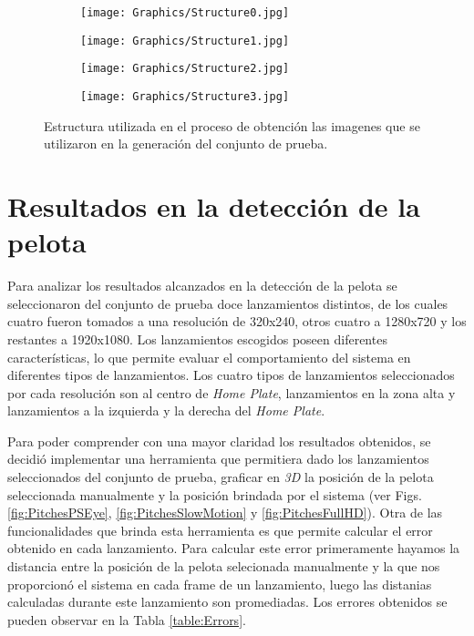 \begin{figure}[!h]
    \centering
    \begin{subfigure}[b]{0.49\linewidth}
        \texttt{[image: Graphics/Structure0.jpg]}
    \end{subfigure}
    \begin{subfigure}[b]{0.49\linewidth}
        \texttt{[image: Graphics/Structure1.jpg]}
    \end{subfigure}
    \begin{subfigure}[b]{0.49\linewidth}
        \texttt{[image: Graphics/Structure2.jpg]}
    \end{subfigure}
    \begin{subfigure}[b]{0.49\linewidth}
        \texttt{[image: Graphics/Structure3.jpg]}
    \end{subfigure}
	\caption{Estructura utilizada en el proceso de obtención las imagenes que se utilizaron en la generación del conjunto de prueba.}
	\label{fig:Structure}
\end{figure}

\section{Resultados en la detección de la pelota}

Para analizar los resultados alcanzados en la detección de la pelota se seleccionaron del conjunto de prueba doce lanzamientos distintos, de los cuales cuatro fueron tomados a una resolución de 320x240, otros cuatro a 1280x720 y los restantes a 1920x1080. Los lanzamientos escogidos poseen diferentes características, lo que permite evaluar el comportamiento del sistema en diferentes tipos de lanzamientos. Los cuatro tipos de lanzamientos seleccionados por cada resolución son al centro de \textit{Home Plate}, lanzamientos en la zona alta y lanzamientos a la izquierda y la derecha del \textit{Home Plate}.

Para poder comprender con una mayor claridad los resultados obtenidos, se decidió implementar una herramienta que permitiera dado los lanzamientos seleccionados del conjunto de prueba, graficar en \textit{3D} la posición de la pelota seleccionada manualmente y la posición brindada por el sistema (ver Figs. \ref{fig:PitchesPSEye}, \ref{fig:PitchesSlowMotion} y \ref{fig:PitchesFullHD}). Otra de las funcionalidades que brinda esta herramienta es que permite calcular el error obtenido en cada lanzamiento. Para calcular este error primeramente hayamos la distancia entre la posición de la pelota selecionada manualmente y la que nos proporcionó el sistema en cada frame de un lanzamiento, luego las distanias calculadas durante este lanzamiento son promediadas. Los errores obtenidos se pueden observar en la Tabla \ref{table:Errors}.


